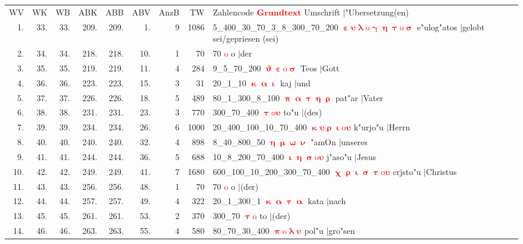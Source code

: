 \documentclass[a4paper,10pt,landscape]{article}
\begin{document}
\begin{tabular}{rrrrrrrrp{120mm}}
WV&WK&WB&ABK&ABB&ABV&AnzB&TW&Zahlencode \textcolor{red}{$\boldsymbol{Grundtext}$} Umschrift $|$"Ubersetzung(en)\\
1.&33.&33.&209.&209.&1.&9&1086&5\_400\_30\_70\_3\_8\_300\_70\_200 \textcolor{red}{$\boldsymbol{\upepsilon\upsilon\uplambda\mathrm{o}\upgamma\upeta\uptau\mathrm{o}\upsigma}$} e"ulog"atos $|$gelobt sei/gepriesen (sei)\\
2.&34.&34.&218.&218.&10.&1&70&70 \textcolor{red}{$\boldsymbol{\mathrm{o}}$} o $|$der\\
3.&35.&35.&219.&219.&11.&4&284&9\_5\_70\_200 \textcolor{red}{$\boldsymbol{\upvartheta\upepsilon\mathrm{o}\upsigma}$} Teos $|$Gott\\
4.&36.&36.&223.&223.&15.&3&31&20\_1\_10 \textcolor{red}{$\boldsymbol{\upkappa\upalpha\upiota}$} kaj $|$und\\
5.&37.&37.&226.&226.&18.&5&489&80\_1\_300\_8\_100 \textcolor{red}{$\boldsymbol{\uppi\upalpha\uptau\upeta\uprho}$} pat"ar $|$Vater\\
6.&38.&38.&231.&231.&23.&3&770&300\_70\_400 \textcolor{red}{$\boldsymbol{\uptau\mathrm{o}\upsilon}$} to"u $|$(des)\\
7.&39.&39.&234.&234.&26.&6&1000&20\_400\_100\_10\_70\_400 \textcolor{red}{$\boldsymbol{\upkappa\upsilon\uprho\upiota\mathrm{o}\upsilon}$} k"urjo"u $|$Herrn\\
8.&40.&40.&240.&240.&32.&4&898&8\_40\_800\_50 \textcolor{red}{$\boldsymbol{\upeta\upmu\upomega\upnu}$} "amOn $|$unseres\\
9.&41.&41.&244.&244.&36.&5&688&10\_8\_200\_70\_400 \textcolor{red}{$\boldsymbol{\upiota\upeta\upsigma\mathrm{o}\upsilon}$} j"aso"u $|$Jesus\\
10.&42.&42.&249.&249.&41.&7&1680&600\_100\_10\_200\_300\_70\_400 \textcolor{red}{$\boldsymbol{\upchi\uprho\upiota\upsigma\uptau\mathrm{o}\upsilon}$} crjsto"u $|$Christus\\
11.&43.&43.&256.&256.&48.&1&70&70 \textcolor{red}{$\boldsymbol{\mathrm{o}}$} o $|$(der)\\
12.&44.&44.&257.&257.&49.&4&322&20\_1\_300\_1 \textcolor{red}{$\boldsymbol{\upkappa\upalpha\uptau\upalpha}$} kata $|$nach\\
13.&45.&45.&261.&261.&53.&2&370&300\_70 \textcolor{red}{$\boldsymbol{\uptau\mathrm{o}}$} to $|$(der)\\
14.&46.&46.&263.&263.&55.&4&580&80\_70\_30\_400 \textcolor{red}{$\boldsymbol{\uppi\mathrm{o}\uplambda\upsilon}$} pol"u $|$gro"sen\\

\end{tabular}
\end{document}
